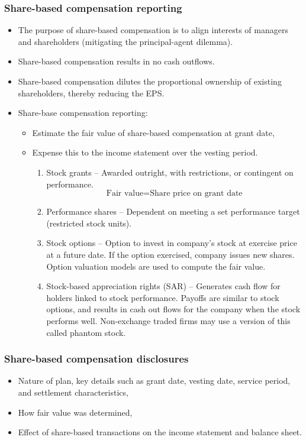 \documentclass[../notes_compiled.tex]{subfiles}
\begin{document}
\subsubsection{Share-based compensation reporting}
\begin{itemize}
\item The purpose of share-based compensation is to align interests of managers and shareholders (mitigating the principal-agent dilemma).
\item Share-based compensation results in no cash outflows.
\item Share-based compensation dilutes the proportional ownership of existing shareholders, thereby reducing the EPS.
\item Share-base compensation reporting:
\begin{itemize}
\item Estimate the fair value of share-based compensation at grant date,
\item Expense this to the income statement over the vesting period.
\begin{enumerate}
\item Stock grants -- Awarded outright, with restrictions, or contingent on performance.
\begin{equation*}
\text{Fair value} = \text{Share price on grant date}
\end{equation*}
\item Performance shares -- Dependent on meeting a set performance target (restricted stock units).
\item Stock options -- Option to invest in company's stock at exercise price at a future date. If the option exercised, company issues new shares. Option valuation models are used to compute the fair value.
\item Stock-based appreciation rights (SAR) -- Generates cash flow for holders linked to stock performance. Payoffs are similar to stock options, and results in cash out flows for the company when the stock performs well. Non-exchange traded firms may use a version of this called phantom stock.
\end{enumerate}
\end{itemize}
\end{itemize}

\subsubsection{Share-based compensation disclosures}
\begin{itemize}
\item Nature of plan, key details such as grant date, vesting date, service period, and settlement characteristics,
\item How fair value was determined,
\item Effect of share-based transactions on the income statement and balance sheet.
\end{itemize}
\end{document}
